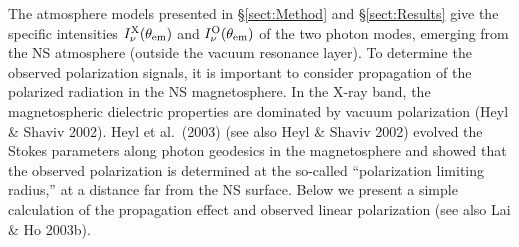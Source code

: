 \documentclass[useAMS,onecolumn,usenatbib,usegraphicx]{mn2e}
\begin{document}
The atmosphere models presented in \S\ref{sect:Method} and
\S\ref{sect:Results} give the specific intensities 
$I_\nu^{\rm X}(\theta_{\rm em})$ and $I_\nu^{\rm O}(\theta_{\rm em})$
of the two photon modes, 
emerging from the NS atmosphere
(outside the vacuum resonance layer). To determine the observed
polarization signals, it is important to consider propagation of the polarized 
radiation in the NS magnetosphere. In the X-ray band, the magnetospheric dielectric 
properties
are dominated by vacuum polarization (Heyl \& Shaviv 2002). 
Heyl et al.~(2003) (see also Heyl \& Shaviv 2002) evolved
the Stokes parameters along photon geodesics in the magnetosphere
and showed that the observed polarization is determined at the 
so-called ``polarization limiting radius,'' at a distance far from the NS surface.
Below we present a simple calculation of the propagation effect and observed
linear polarization (see also Lai \& Ho 2003b).
\end{document}
